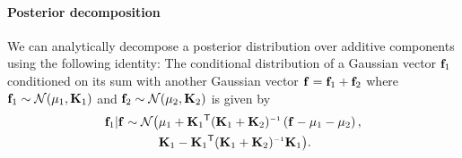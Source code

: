 \documentclass[twoside]{article}
\begin{document}
\paragraph{Posterior decomposition}
\label{sec:decomposing}
We can analytically decompose a \gp{} posterior distribution over additive components using the following identity:
The conditional distribution of a Gaussian vector ${\bf{f}}_1$ conditioned on its sum with another Gaussian vector ${\bf{f}} = {\bf{f}}_1 + {\bf{f}}_2$ where ${\bf{f}}_1 \sim \mathcal{N}\!\left({\bf{\mu}}_1,\mathbf{K}_1\right)$ and ${\bf{f}}_2 \sim \mathcal{N}\!\left({\bf{\mu}}_2,\mathbf{K}_2\right)$ is given by
%
\begin{align}
\vf_1 | \vf \sim \mathcal{N} \big( & \vmu_1 + \vK_1\tra (\vK_1 + \vK_2)\inv \left( \vf - \vmu_1 - \vmu_2 \right), \nonumber \\
& \vK_1 - \vK_1\tra (\vK_1 + \vK_2)\inv \vK_1 \big) \nonumber .
\end{align}
%

\newpage


\end{document}
